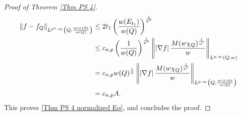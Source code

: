 \documentclass[10pt,a4paper]{amsart}
\newcommand{\strt}[1]{\rule{0pt}{#1}}
\begin{document}
\begin{proof}[Proof of Theorem \ref{Thm PS 4}]
\begin{align*}
    \left\| f-f_Q\right\|_{L^{p^*,\infty}\left(Q,\frac{w(x)dx}{w(Q)}\right)}
    &\le 2t_1 \left(\frac{w(E_{t_1})}{w(Q)}\right)^\frac{1}{p^*} \\
    &\le c_{n,p} \left(\frac{1}{w(Q)}\right)^\frac{1}{p^*} \left\| \left| \nabla f \right| \frac{M(w\chi_Q)^\frac{1}{n'}}{w} \right\|_{\strt{2.3ex} L^{p,\infty}(Q,w)} \\
    &= c_{n,p} w(Q)^\frac{1}{n} \left\| \left| \nabla f \right| \frac{M(w\chi_Q)^\frac{1}{n'}}{w} \right\|_{\strt{2.3ex} L^{p,\infty}\left(Q,\frac{w(x)dx}{w(Q)}\right)} \\
    &= c_{n,p}A.
\end{align*}
This proves \eqref{Thm PS 4 normalized Eq}, and concludes the proof. 
\end{proof}
\end{document}
